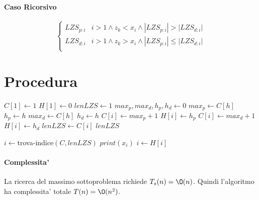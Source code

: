 \paragraph{Caso Ricorsivo}

\[
    \begin{cases}
        \text{$LZS_{p:i}$} & \text{$i > 1 \land z_{k} < x_i \land |LZS_{p:i}| > |LZS_{d:i}|$} \\
        \text{$LZS_{d:i}$} & \text{$i > 1 \land z_{k} > x_i \land |LZS_{p:i}| \leq |LZS_{d:i}|$} \\
    \end{cases}
\]

\newpage

\section{Procedura}

\begin{algorithm}
    \begin{algorithmic}
            \State $C[1] \gets 1$
            \State $H[1] \gets 0$
            \State $lenLZS \gets 1$
                \State $max_p, max_d, h_p, h_d \gets 0$
                        \State $max_p \gets C[h]$
                        \State $h_p \gets h$
                        \State $max_d \gets C[h]$
                        \State $h_d \gets h$
                    \EndIf
                \EndFor
                    \State $C[i] \gets max_p + 1$
                    \State $H[i] \gets h_p$
                \Else
                    \State $C[i] \gets max_d + 1$
                    \State $H[i] \gets h_d$
                \EndIf
                    \State $lenLZS \gets C[i]$
                \EndIf
            \EndFor
            \State \Return $lenLZS$
        \EndProcedure
    \end{algorithmic}
\end{algorithm}

\begin{algorithm}
    \begin{algorithmic}
            \State $i \gets $trova-indice$(C, lenLZS)$
                \State $print(x_{i})$
                \State $i \gets H[i]$
            \EndWhile
        \EndProcedure
    \end{algorithmic}
\end{algorithm}

\paragraph{Complessita'}
La ricerca del massimo sottoproblema richiede $T_s(n) = \O(n)$.
Quindi l'algoritmo ha complessita' totale $T(n) = \O(n^2)$.